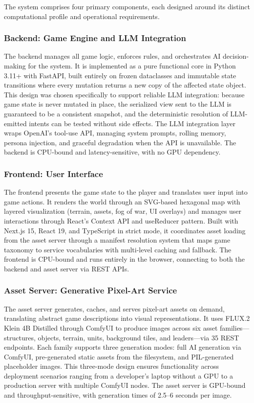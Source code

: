 \documentclass[conference]{IEEEtran}
\begin{document}
The system comprises four primary components, each designed around its distinct computational profile and operational requirements.

\subsubsection{Backend: Game Engine and LLM Integration}

The backend manages all game logic, enforces rules, and orchestrates AI decision-making for the system. It is implemented as a pure functional core in Python 3.11+ with FastAPI, built entirely on frozen dataclasses and immutable state transitions where every mutation returns a new copy of the affected state object. This design was chosen specifically to support reliable LLM integration: because game state is never mutated in place, the serialized view sent to the LLM is guaranteed to be a consistent snapshot, and the deterministic resolution of LLM-emitted intents can be tested without side effects. The LLM integration layer wraps OpenAI's tool-use API, managing system prompts, rolling memory, persona injection, and graceful degradation when the API is unavailable. The backend is CPU-bound and latency-sensitive, with no GPU dependency.

\subsubsection{Frontend: User Interface}

The frontend presents the game state to the player and translates user input into game actions. It renders the world through an SVG-based hexagonal map with layered visualization (terrain, assets, fog of war, UI overlays) and manages user interactions through React's Context API and useReducer pattern. Built with Next.js 15, React 19, and TypeScript in strict mode, it coordinates asset loading from the asset server through a manifest resolution system that maps game taxonomy to service vocabularies with multi-level caching and fallback. The frontend is CPU-bound and runs entirely in the browser, connecting to both the backend and asset server via REST APIs.

\subsubsection{Asset Server: Generative Pixel-Art Service}

The asset server generates, caches, and serves pixel-art assets on demand, translating abstract game descriptions into visual representations. It uses FLUX.2 Klein 4B Distilled through ComfyUI to produce images across six asset families---structures, objects, terrain, units, background tiles, and leaders---via 35 REST endpoints. Each family supports three generation modes: full AI generation via ComfyUI, pre-generated static assets from the filesystem, and PIL-generated placeholder images. This three-mode design ensures functionality across deployment scenarios ranging from a developer's laptop without a GPU to a production server with multiple ComfyUI nodes. The asset server is GPU-bound and throughput-sensitive, with generation times of 2.5--6 seconds per image.
\end{document}
